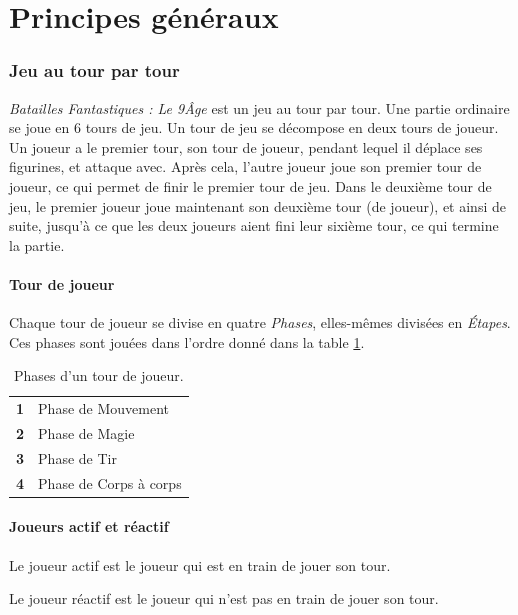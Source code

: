 
\part{Principes généraux}

\section{Jeu au tour par tour}

\emph{Batailles Fantastiques : Le 9\ieme Âge} est un jeu au tour par tour. Une partie ordinaire se joue en 6 tours de jeu. Un tour de jeu se décompose en deux tours de joueur. Un joueur a le premier tour, son tour de joueur, pendant lequel il déplace ses figurines, et attaque avec. Après cela, l'autre joueur joue son premier tour de joueur, ce qui permet de finir le premier tour de jeu. Dans le deuxième tour de jeu, le premier joueur joue maintenant son deuxième tour (de joueur), et ainsi de suite, jusqu'à ce que les deux joueurs aient fini leur sixième tour, ce qui termine la partie.

\subsection{Tour de joueur}

Chaque tour de joueur se divise en quatre \emph{Phases}, elles-mêmes divisées en \emph{Étapes}. Ces phases sont jouées dans l'ordre donné dans la table \ref{table/phases}.

\begin{table}[!htbp]
\centering
\begin{tabular}{c|l}
\textbf{1} & Phase de Mouvement \tabularnewline
\textbf{2} & Phase de Magie \tabularnewline
\textbf{3} & Phase de Tir \tabularnewline
\textbf{4} & Phase de Corps à corps \tabularnewline
\end{tabular}
\caption{\label{table/phases}Phases d'un tour de joueur.}
\end{table}

\subsection{Joueurs actif et réactif}

Le joueur actif est le joueur qui est en train de jouer son tour.

Le joueur réactif est le joueur qui n'est pas en train de jouer son tour.

